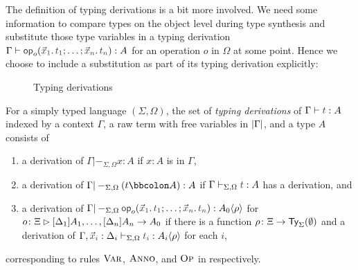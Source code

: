 The definition of typing derivations is a bit more involved.
We need some information to compare types on the object level during type synthesis and substitute those type variables in a typing derivation $\Gamma \vdash \tmOpts : A$ for an operation $o$ in $\Omega$ at some point.
Hence we choose to include a substitution as part of its typing derivation explicitly:
\begin{definition}\label{def:typing-derivations}
  \begin{figure}
    \centering
    \small
    \caption{Typing derivations}
    \label{fig:extrinsic-typing}
  \end{figure}
  For a simply typed language $(\Sigma, \Omega)$, the set of \emph{typing derivations} of $\Gamma \vdash \isTerm{t} : A$ indexed by a context $\Gamma$, a raw term with free variables in $\left|\Gamma\right|$, and a type $A$ consists of 
  \begin{enumerate}
    \item a derivation of $\Gamma |-_{\Sigma, \Omega} x : A$ if $x : A$ is in $\Gamma$,
    \item a derivation of $\Gamma |-_{\Sigma, \Omega} (t \annotate A) : A$ if $\Gamma \vdash_{\Sigma, \Omega} \isTerm{t} : A$ has a derivation, and
    \item a derivation of $\Gamma |-_{\Sigma, \Omega} \tmOpts : \simsub{A_0}{\rho}$ for $o\colon\Xi \rhd [\Delta_1]A_1, \ldots, [\Delta_{n}]A_{n} \to A_0$ if there is a function $\rho\colon \Xi \to \mathsf{Ty}_{\Sigma}(\emptyset)$ and a derivation of $\Gamma, \vars{x}_{\isTerm{i}} : \Delta_i \vdash_{\Sigma, \Omega} \isTerm{t_i} : \simsub{A_i}{\rho}$ for each $i$,
  \end{enumerate}
  corresponding to rules $\textnormal{\textsc{Var}}$, $\textnormal{\textsc{Anno}}$, and $\textnormal{\textsc{Op}}$ in  respectively.
\end{definition}

